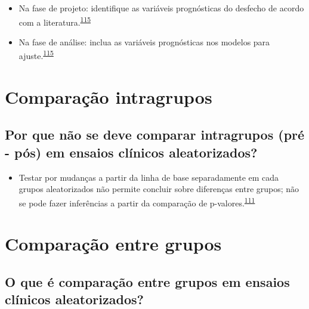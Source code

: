 \documentclass[
]{book}
\providecommand{\tightlist}{%
  \setlength{\itemsep}{0pt}\setlength{\parskip}{0pt}}
\begin{document}
\begin{itemize}
\item
  Na fase de projeto: identifique as variáveis prognósticas do desfecho de acordo com a literatura.\textsuperscript{\protect\hyperlink{ref-roberts1999}{115}}
\item
  Na fase de análise: inclua as variáveis prognósticas nos modelos para ajuste.\textsuperscript{\protect\hyperlink{ref-roberts1999}{115}}
\end{itemize}

\hypertarget{comparacao-intragrupos}{%
\section{Comparação intragrupos}\label{comparacao-intragrupos}}

\hypertarget{por-que-nuxe3o-se-deve-comparar-intragrupos-pruxe9---puxf3s-em-ensaios-cluxednicos-aleatorizados}{%
\subsection{Por que não se deve comparar intragrupos (pré - pós) em ensaios clínicos aleatorizados?}\label{por-que-nuxe3o-se-deve-comparar-intragrupos-pruxe9---puxf3s-em-ensaios-cluxednicos-aleatorizados}}

\begin{itemize}
\tightlist
\item
  Testar por mudanças a partir da linha de base separadamente em cada grupos aleatorizados não permite concluir sobre diferenças entre grupos; não se pode fazer inferências a partir da comparação de p-valores.\textsuperscript{\protect\hyperlink{ref-bland2011}{111}}
\end{itemize}

\hypertarget{comparacao-entre-grupos}{%
\section{Comparação entre grupos}\label{comparacao-entre-grupos}}

\hypertarget{o-que-uxe9-comparauxe7uxe3o-entre-grupos-em-ensaios-cluxednicos-aleatorizados}{%
\subsection{O que é comparação entre grupos em ensaios clínicos aleatorizados?}\label{o-que-uxe9-comparauxe7uxe3o-entre-grupos-em-ensaios-cluxednicos-aleatorizados}}
\end{document}
